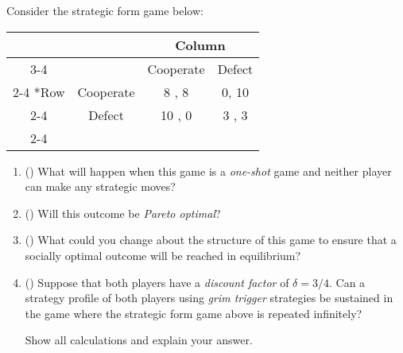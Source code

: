 \begin{question}[type=exam]{16}
  
  Consider the strategic form game below: 

  \begin{table}[!h]
    \centering
    \begin{tabular}{*{4}{c|}}
      \multicolumn{2}{c}{} & \multicolumn{2}{c}{Column} \\ \cline{3-4}
      \multicolumn{1}{c}{} &         & Cooperate & Defect \\ \cline{2-4}
      \multirow{2}*{Row} & Cooperate & 8  , 8 & 0, 10 \\ \cline{2-4}
                         & Defect    & 10 , 0 & 3 , 3 \\ \cline{2-4} 
    \end{tabular} 
  \end{table} 

  \begin{enumerate}[label=\Alph*)]

    \item ()
    What will happen when this game is a \textit{one-shot} game and neither player can make any strategic moves?
    \vspace{2cm}

    \item ()
    Will this outcome be \textit{Pareto optimal}?
    \vspace{2cm}

    \item ()
    What could you change about the structure of this game to ensure that a socially optimal outcome will be reached in equilibrium? 
    \vspace{3cm}

    \item ()
    Suppose that both players have a \textit{discount factor} of $\delta=3/4$.
    Can a strategy profile of both players using \textit{grim trigger} strategies 
    be sustained in the game where the strategic form game above is repeated infinitely?

    Show all calculations and explain your answer.

    \vspace{5cm}
    
  \end{enumerate}

\end{question}
